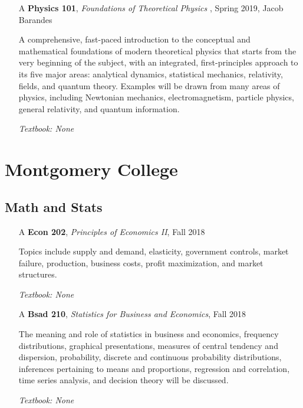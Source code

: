\documentclass{scrartcl}
\begin{document}
\begin{itemize}
  \item[A] \textbf{Physics 101}, \textit{Foundations of Theoretical Physics }, Spring 2019, Jacob Barandes 

  A comprehensive, fast-paced introduction to the conceptual and mathematical foundations of modern theoretical physics that starts from the very beginning of the subject, with an integrated, first-principles approach to its five major areas: analytical dynamics, statistical mechanics, relativity, fields, and quantum theory. Examples will be drawn from many areas of physics, including Newtonian mechanics, electromagnetism, particle physics, general relativity, and quantum information. 

  \textit{\small Textbook: None}
\end{itemize} 

\section*{Montgomery College}

\subsection*{Math and Stats}

\begin{itemize}
  \item[A] \textbf{Econ 202}, \textit{Principles of Economics II}, Fall 2018
  
  Topics include supply and demand, elasticity, government controls, market failure, production, business costs, profit maximization, and market structures. 
  
  \textit{\small Textbook: None}
  
  \item[A] \textbf{Bsad 210}, \textit{Statistics for Business and Economics}, Fall 2018
  
  The meaning and role of statistics in business and economics, frequency distributions, graphical presentations, measures of central tendency and dispersion, probability, discrete and continuous probability distributions, inferences pertaining to means and proportions, regression and correlation, time series analysis, and decision theory will be discussed.
  
  \textit{\small Textbook: None}
  
\end{itemize} 
\end{document}
